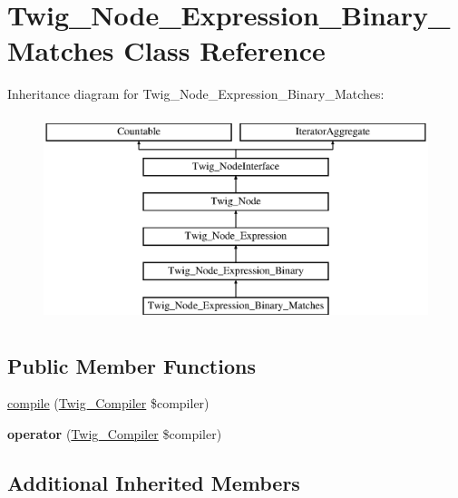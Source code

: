 \hypertarget{classTwig__Node__Expression__Binary__Matches}{}\section{Twig\+\_\+\+Node\+\_\+\+Expression\+\_\+\+Binary\+\_\+\+Matches Class Reference}
\label{classTwig__Node__Expression__Binary__Matches}
Inheritance diagram for Twig\+\_\+\+Node\+\_\+\+Expression\+\_\+\+Binary\+\_\+\+Matches\+:\begin{figure}[H]
\begin{center}
\leavevmode
\includegraphics[height=6.000000cm]{classTwig__Node__Expression__Binary__Matches}
\end{center}
\end{figure}
\subsection*{Public Member Functions}
\begin{DoxyCompactItemize}
\item 
\hyperlink{classTwig__Node__Expression__Binary__Matches_a301198485261d61b774170209ee68fa0}{compile} (\hyperlink{classTwig__Compiler}{Twig\+\_\+\+Compiler} \$compiler)
\item 
{\bfseries operator} (\hyperlink{classTwig__Compiler}{Twig\+\_\+\+Compiler} \$compiler)\hypertarget{classTwig__Node__Expression__Binary__Matches_ac3348a39610eceeca4738857e2bab9d7}{}\label{classTwig__Node__Expression__Binary__Matches_ac3348a39610eceeca4738857e2bab9d7}

\end{DoxyCompactItemize}
\subsection*{Additional Inherited Members}


